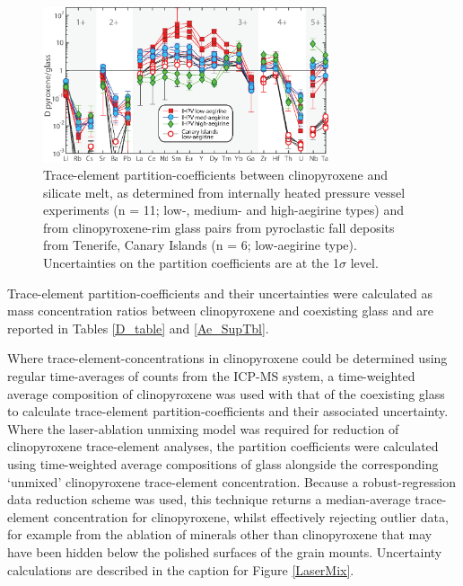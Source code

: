 \documentclass[review,authoryear,12pt]{elsarticle}
\begin{document}
        \begin{figure}[tb]
        \begin{center}
        \includegraphics[width=0.75\textwidth]{6_Px_D_Spider_Apr2018.eps}
        \caption[Extended trace-element-partitioning diagram for clinopyroxene/melt]{Trace-element partition-coefficients between clinopyroxene and silicate melt, as determined from internally heated pressure vessel experiments (n = 11; low-, medium- and high-aegirine types) and from clinopyroxene-rim glass pairs from pyroclastic fall deposits from Tenerife, Canary Islands (n = 6; low-aegirine type). Uncertainties on the partition coefficients are at the 1$\sigma$ level.}
        \label{6_D_Spider}
        \end{center}
        \end{figure}


Trace-element partition-coefficients and their uncertainties were calculated as mass concentration ratios between clinopyroxene and coexisting glass and 
 are reported in Tables \ref{D_table} and \ref{Ae_SupTbl}. 


 Where trace-element-concentrations in clinopyroxene could be determined using regular time-averages of counts from the ICP-MS system, a time-weighted average composition of clinopyroxene was used with that of the coexisting glass to calculate trace-element partition-coefficients and their associated uncertainty. Where the laser-ablation unmixing model was required for reduction of clinopyroxene trace-element analyses, the partition coefficients were calculated using time-weighted average compositions of glass alongside the corresponding `unmixed' clinopyroxene trace-element concentration. Because a robust-regression data reduction scheme was used, this technique returns a median-average trace-element concentration for clinopyroxene, whilst effectively rejecting outlier data, for example from the ablation of minerals other than clinopyroxene that may have been hidden below the polished surfaces of the grain mounts. Uncertainty calculations are described in the caption for Figure \ref{LaserMix}.
\end{document}
